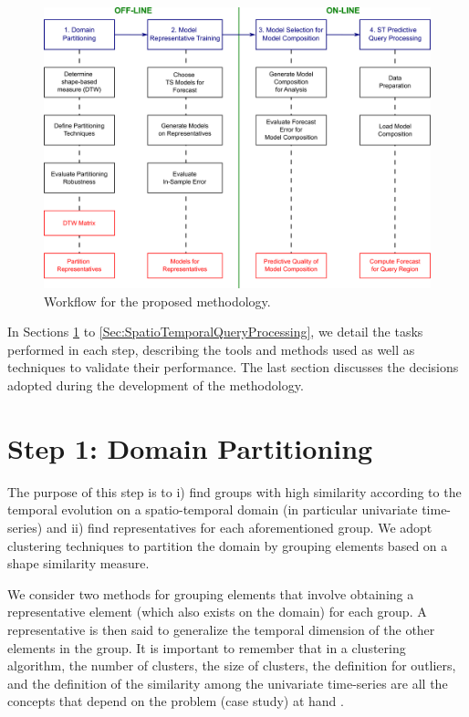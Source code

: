 \begin{figure}[ht]
	\centering
	\includegraphics[scale=0.16]{../Figures/Methodology_Corrections}
	\caption{Workflow for the proposed methodology.}
	\label{Fig:OverviewMethodology}
\end{figure}

In Sections \ref{Sec:DomainPartitioning} to \ref{Sec:SpatioTemporalQueryProcessing}, we detail the tasks performed in each step, describing the tools and methods used as well as techniques to validate their performance. The last section discusses the decisions adopted during the development of the methodology.

\section{Step 1: Domain Partitioning}
\label{Sec:DomainPartitioning}

The purpose of this step is to i) find groups with high similarity according to the temporal evolution on a spatio-temporal domain (in particular univariate time-series) and ii) find representatives for each aforementioned group. We adopt clustering techniques to partition the domain by grouping elements based on a shape similarity measure. 

We consider two methods for grouping elements that involve obtaining a representative element (which also exists on the domain) for each group. A representative is then said to generalize the temporal dimension of the other elements in the group. It is important to remember that in a clustering algorithm, the number of clusters, the size of clusters, the definition for outliers, and the definition of the similarity among the univariate time-series are all the concepts that depend on the problem (case study) at hand \cite{Aghabozorgi2015}.

